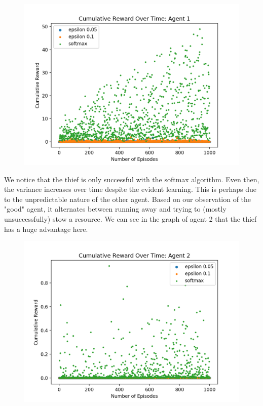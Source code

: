 \documentclass[11pt]{article}
\begin{document}

\begin{figure}[H]
  \centering
  \includegraphics[width=.7\textwidth]{thief-agent1}
\end{figure}



We notice that the thief is only successful with the softmax algorithm. Even then, the variance increases over time despite the evident learning. This is perhaps due to the unpredictable nature of the other agent. Based on our observation of the "good" agent, it alternates between running away and trying to (mostly unsuccessfully) stow a resource. We can see in the graph of agent 2 that the thief has a huge advantage here. 


\begin{figure}[H]
  \centering
  \includegraphics[width=.7\textwidth]{thief-agent2}
\end{figure}
\end{document}

